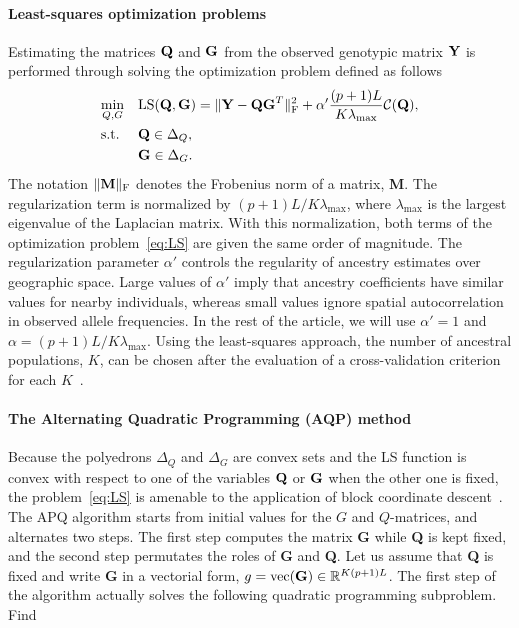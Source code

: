 \paragraph{Least-squares optimization problems} Estimating the matrices ${\bf Q}$ and ${\bf G }$ from the observed genotypic matrix ${\bf Y}$ is performed through solving the optimization problem defined as follows~\citep{Caye2016}
\begin{equation}
\begin{aligned}
& \underset{Q, G}{\text{min}}
& & {\rm LS}({\bf Q}, {\bf G}) =   \|  {\bf Y} - {\bf QG}^T \|^2_{\rm F} +  \alpha ' \frac{(p+1)L}{K \lambda_{\max}} {\cal C}({\bf Q}) , \\
& \text{s.t.} & &  {\bf Q} \in \Delta_Q , \\
& & &  {\bf G} \in \Delta_G . \\
\end{aligned}
\label{eq:LS}
\end{equation}
 \noindent The notation $\|  {\bf M}  \|_{\rm F}$ denotes the Frobenius norm of a matrix, {\bf M}. The regularization term is normalized by $(p+1)L/K \lambda_{\max}$, where $\lambda_{\max}$ is the largest eigenvalue of the Laplacian matrix. With this normalization, both terms of the optimization problem~\eqref{eq:LS} are given the same order of magnitude. The regularization parameter $\alpha ' $ controls the regularity of ancestry estimates over geographic space.  Large values of $\alpha ' $ imply that ancestry coefficients have similar values for nearby individuals, whereas small values ignore spatial autocorrelation in observed allele frequencies. In the rest of the article, we will use $\alpha ' = 1$ and $\alpha = (p+1)L/K \lambda_{\max}$. Using the least-squares approach, the number of ancestral populations, $K$, can be chosen after the evaluation of a cross-validation criterion for each $K$~\citep{Alexander2011, Frichot2014, Frichot2015}.


\paragraph{The Alternating Quadratic Programming (AQP) method} Because the poly\-edrons $\Delta_Q$ and  $\Delta_G$ are convex sets and the LS function is convex with
respect to one of the variables ${\bf Q}$ or ${\bf G}$ when the other one is fixed, the problem~\eqref{eq:LS} is amenable to the application of block coordinate descent~\citep{Bertsekas1995}. The APQ algorithm starts from initial values for the $G$ and $Q$-matrices, and alternates two steps. The first step computes the matrix {\bf G} while  {\bf Q} is kept fixed, and the second step permutates the roles of {\bf G} and {\bf Q}.  Let us assume that {\bf Q} is fixed and write {\bf G} in a vectorial form, $g = {\rm vec({\bf G})} \in \mathbb{R}^{K(p + 1)L}$. The first step of the algorithm actually solves the following quadratic programming subproblem. Find  

